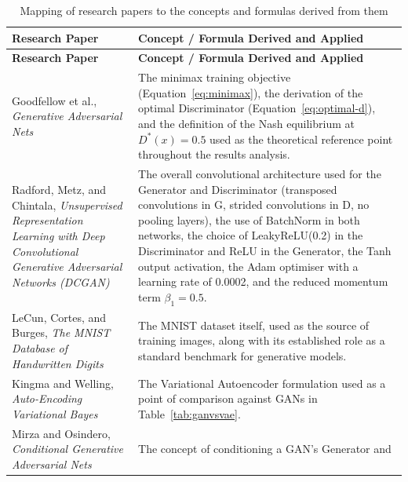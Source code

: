 \documentclass[12pt,a4paper]{article}
\begin{document}
\begin{center}
    \begin{longtable}{|L{3.6cm}|L{9.5cm}|}
        \caption{Mapping of research papers to the concepts and formulas derived from them}
        \label{tab:literature} \\
            \hline
            \textbf{Research Paper} & \textbf{Concept / Formula Derived and Applied} \\
            \hline
        \endfirsthead
            \hline
            \textbf{Research Paper} & \textbf{Concept / Formula Derived and Applied} \\
            \hline
        \endhead
            Goodfellow et al., \textit{Generative Adversarial Nets} \cite{goodfellow2014} &
            The minimax training objective (Equation~\ref{eq:minimax}), the derivation of
            the optimal Discriminator (Equation~\ref{eq:optimal-d}), and the definition of
            the Nash equilibrium at $D^*(x) = 0.5$ used as the theoretical reference point
            throughout the results analysis. \\
            \hline
            Radford, Metz, and Chintala, \textit{Unsupervised Representation Learning with
            Deep Convolutional Generative Adversarial Networks (DCGAN)} \cite{radford2015} &
            The overall convolutional architecture used for the Generator and
            Discriminator (transposed convolutions in G, strided convolutions in D, no
            pooling layers), the use of BatchNorm in both networks, the choice of
            LeakyReLU(0.2) in the Discriminator and ReLU in the Generator, the Tanh output
            activation, the Adam optimiser with a learning rate of 0.0002, and the reduced
            momentum term $\beta_1 = 0.5$. \\
            \hline
            LeCun, Cortes, and Burges, \textit{The MNIST Database of Handwritten Digits}
            \cite{lecun1998} & The MNIST dataset itself, used as the source of training
            images, along with its established role as a standard benchmark for
            generative models. \\
            \hline
            Kingma and Welling, \textit{Auto-Encoding Variational Bayes} \cite{kingma2013} &
            The Variational Autoencoder formulation used as a point of comparison against
            GANs in Table~\ref{tab:ganvsvae}. \\
            \hline
            Mirza and Osindero, \textit{Conditional Generative Adversarial Nets}
            \cite{mirza2014} & The concept of conditioning a GAN's Generator and

\end{longtable}
\end{center}
\end{document}
